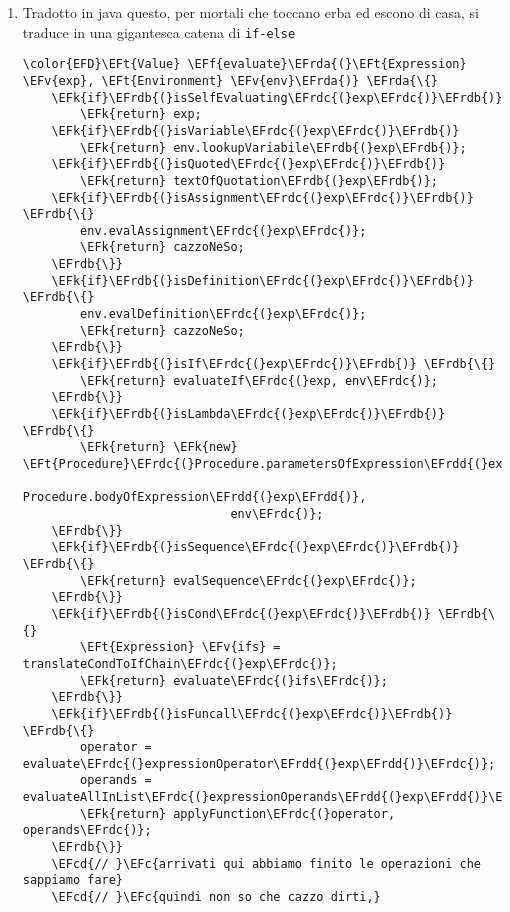 \documentclass[11pt]{article}
\newcommand{\EFc}[1]{\textcolor{EFc}{#1}} %
\newcommand{\EFcd}[1]{\textcolor{EFcd}{#1}} %
\newcommand{\EFs}[1]{\textcolor{EFs}{#1}} %
\newcommand{\EFk}[1]{\textcolor{EFk}{#1}} %
\newcommand{\EFf}[1]{\textcolor{EFf}{#1}} %
\newcommand{\EFv}[1]{\textcolor{EFv}{#1}} %
\newcommand{\EFt}[1]{\textcolor{EFt}{#1}} %
\newcommand{\EFrda}[1]{\textcolor{EFrda}{#1}} %
\newcommand{\EFrdb}[1]{\textcolor{EFrdb}{#1}} %
\newcommand{\EFrdc}[1]{\textcolor{EFrdc}{#1}} %
\newcommand{\EFrdd}[1]{\textcolor{EFrdd}{#1}} %
\begin{document}
\begin{enumerate}
\begin{Code}
\begin{Verbatim}
        \EFrdc{(}\EFk{else}
         \EFrdd{(}error \EFs{"Unknown expression type: EVAL"} exp\EFrdd{)}\EFrdc{)}\EFrdb{)}\EFrda{)}
\end{Verbatim}
\end{Code}
\item Tradotto in java
\label{sec:orgdb96ddb}
questo, per mortali che toccano erba ed escono di casa, si traduce in una gigantesca catena di \texttt{if-else}
\begin{Code}
\begin{Verbatim}
\color{EFD}\EFt{Value} \EFf{evaluate}\EFrda{(}\EFt{Expression} \EFv{exp}, \EFt{Environment} \EFv{env}\EFrda{)} \EFrda{\{}
    \EFk{if}\EFrdb{(}isSelfEvaluating\EFrdc{(}exp\EFrdc{)}\EFrdb{)}
        \EFk{return} exp;
    \EFk{if}\EFrdb{(}isVariable\EFrdc{(}exp\EFrdc{)}\EFrdb{)}
        \EFk{return} env.lookupVariabile\EFrdb{(}exp\EFrdb{)};
    \EFk{if}\EFrdb{(}isQuoted\EFrdc{(}exp\EFrdc{)}\EFrdb{)}
        \EFk{return} textOfQuotation\EFrdb{(}exp\EFrdb{)};
    \EFk{if}\EFrdb{(}isAssignment\EFrdc{(}exp\EFrdc{)}\EFrdb{)} \EFrdb{\{}
        env.evalAssignment\EFrdc{(}exp\EFrdc{)};
        \EFk{return} cazzoNeSo;
    \EFrdb{\}}
    \EFk{if}\EFrdb{(}isDefinition\EFrdc{(}exp\EFrdc{)}\EFrdb{)} \EFrdb{\{}
        env.evalDefinition\EFrdc{(}exp\EFrdc{)};
        \EFk{return} cazzoNeSo;
    \EFrdb{\}}
    \EFk{if}\EFrdb{(}isIf\EFrdc{(}exp\EFrdc{)}\EFrdb{)} \EFrdb{\{}
        \EFk{return} evaluateIf\EFrdc{(}exp, env\EFrdc{)};
    \EFrdb{\}}
    \EFk{if}\EFrdb{(}isLambda\EFrdc{(}exp\EFrdc{)}\EFrdb{)} \EFrdb{\{}
        \EFk{return} \EFk{new} \EFt{Procedure}\EFrdc{(}Procedure.parametersOfExpression\EFrdd{(}exp\EFrdd{)},
                             Procedure.bodyOfExpression\EFrdd{(}exp\EFrdd{)},
                             env\EFrdc{)};
    \EFrdb{\}}
    \EFk{if}\EFrdb{(}isSequence\EFrdc{(}exp\EFrdc{)}\EFrdb{)} \EFrdb{\{}
        \EFk{return} evalSequence\EFrdc{(}exp\EFrdc{)};
    \EFrdb{\}}
    \EFk{if}\EFrdb{(}isCond\EFrdc{(}exp\EFrdc{)}\EFrdb{)} \EFrdb{\{}
        \EFt{Expression} \EFv{ifs} = translateCondToIfChain\EFrdc{(}exp\EFrdc{)};
        \EFk{return} evaluate\EFrdc{(}ifs\EFrdc{)};
    \EFrdb{\}}
    \EFk{if}\EFrdb{(}isFuncall\EFrdc{(}exp\EFrdc{)}\EFrdb{)} \EFrdb{\{}
        operator = evaluate\EFrdc{(}expressionOperator\EFrdd{(}exp\EFrdd{)}\EFrdc{)};
        operands = evaluateAllInList\EFrdc{(}expressionOperands\EFrdd{(}exp\EFrdd{)}\EFrdc{)};
        \EFk{return} applyFunction\EFrdc{(}operator, operands\EFrdc{)};
    \EFrdb{\}}
    \EFcd{// }\EFc{arrivati qui abbiamo finito le operazioni che sappiamo fare}
    \EFcd{// }\EFc{quindi non so che cazzo dirti,}

\end{Verbatim}
\end{Code}
\end{enumerate}
\end{document}
